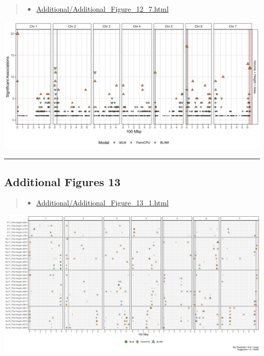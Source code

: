 \documentclass[
]{article}
\providecommand{\tightlist}{%
  \setlength{\itemsep}{0pt}\setlength{\parskip}{0pt}}
\begin{document}
\pagebreak

\begin{quote}
\begin{itemize}
\tightlist
\item
  \href{https://derekmichaelwright.github.io/AGILE_LDP_UAV/Additional/Additional_Figure_12_7.html}{Additional/Additional\_Figure\_12\_7.html}
\end{itemize}
\end{quote}

\includegraphics{Additional/Additional_Figure_12_7.png}

\begin{center}\rule{0.5\linewidth}{0.5pt}\end{center}

\pagebreak

\subsection{Additional Figures 13}\label{additional-figures-13}

\begin{quote}
\begin{itemize}
\tightlist
\item
  \href{https://derekmichaelwright.github.io/AGILE_LDP_UAV/Additional/Additional_Figure_13_1.html}{Additional/Additional\_Figure\_13\_1.html}
\end{itemize}
\end{quote}

\includegraphics{Additional/Additional_Figure_13_1.png}
\end{document}
